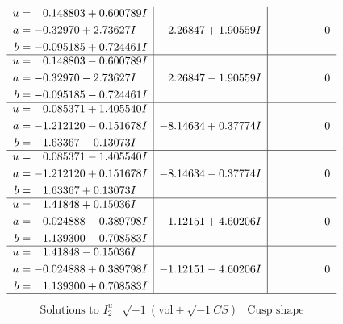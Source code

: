 \documentclass[1p]{elsarticle_modified}
\theoremstyle{definition}
\newcommand{\I}{\sqrt{-1}}
\begin{document}
$$\begin{array}{c|c|c}
\begin{aligned}
u &= \phantom{-}0.148803 + 0.600789 I \\
a &= -0.32970 + 2.73627 I \\
b &= -0.095185 + 0.724461 I\end{aligned}
 & \phantom{-}2.26847 + 1.90559 I & \phantom{-0.000000 } 0 \\ \hline\begin{aligned}
u &= \phantom{-}0.148803 - 0.600789 I \\
a &= -0.32970 - 2.73627 I \\
b &= -0.095185 - 0.724461 I\end{aligned}
 & \phantom{-}2.26847 - 1.90559 I & \phantom{-0.000000 } 0 \\ \hline\begin{aligned}
u &= \phantom{-}0.085371 + 1.405540 I \\
a &= -1.212120 - 0.151678 I \\
b &= \phantom{-}1.63367 - 0.13073 I\end{aligned}
 & -8.14634 + 0.37774 I & \phantom{-0.000000 } 0 \\ \hline\begin{aligned}
u &= \phantom{-}0.085371 - 1.405540 I \\
a &= -1.212120 + 0.151678 I \\
b &= \phantom{-}1.63367 + 0.13073 I\end{aligned}
 & -8.14634 - 0.37774 I & \phantom{-0.000000 } 0 \\ \hline\begin{aligned}
u &= \phantom{-}1.41848 + 0.15036 I \\
a &= -0.024888 - 0.389798 I \\
b &= \phantom{-}1.139300 - 0.708583 I\end{aligned}
 & -1.12151 + 4.60206 I & \phantom{-0.000000 } 0 \\ \hline\begin{aligned}
u &= \phantom{-}1.41848 - 0.15036 I \\
a &= -0.024888 + 0.389798 I \\
b &= \phantom{-}1.139300 + 0.708583 I\end{aligned}
 & -1.12151 - 4.60206 I & \phantom{-0.000000 } 0\\
 \hline 
 \end{array}$$\newpage$$\begin{array}{c|c|c}  
\text{Solutions to }I^u_{2}& \I (\text{vol} + \sqrt{-1}CS) & \text{Cusp shape}\\
 \hline 
\begin{aligned}

\end{aligned}
\end{array}$$
\end{document}

